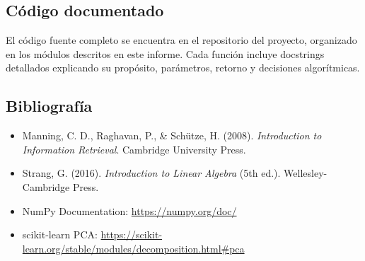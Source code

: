 \documentclass[12pt, a4paper]{article}
\begin{document}
\subsection{Código documentado}
El código fuente completo se encuentra en el repositorio del proyecto, organizado en los módulos descritos en este informe. Cada función incluye docstrings detallados explicando su propósito, parámetros, retorno y decisiones algorítmicas.

\subsection{Bibliografía}
\begin{itemize}
    \item Manning, C. D., Raghavan, P., \& Schütze, H. (2008). \textit{Introduction to Information Retrieval}. Cambridge University Press.
    \item Strang, G. (2016). \textit{Introduction to Linear Algebra} (5th ed.). Wellesley-Cambridge Press.
    \item NumPy Documentation: \url{https://numpy.org/doc/}
    \item scikit-learn PCA: \url{https://scikit-learn.org/stable/modules/decomposition.html#pca}
\end{itemize}
\end{document}
